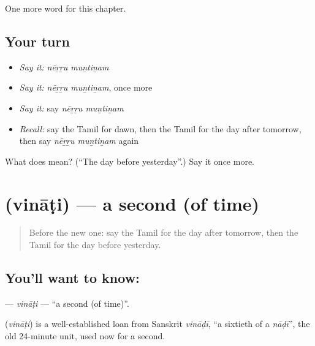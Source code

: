 \begin{grammarlens}[title={What you've built}]
One more word for this chapter.
\end{grammarlens}

\subsection*{Your turn}
\begin{itemize}
\raggedright
  \item \emph{Say it:} \emph{nēṟṟu muṉtiṉam}
  \item \emph{Say it:} \emph{nēṟṟu muṉtiṉam}, once more
  \item \emph{Say it:} say \emph{nēṟṟu muṉtiṉam}
  \item \emph{Recall:} say the Tamil for dawn, then the Tamil for the day after tomorrow, then say \emph{nēṟṟu muṉtiṉam} again
\end{itemize}

\begin{tcolorbox}[breakable,colback=teal!4,colframe=teal!35!black,title={Before you move on}]
What does   mean? (\textquotedblleft{}The day before yesterday\textquotedblright{}.) Say it once more.
\end{tcolorbox}
\section[\texorpdfstring{\ta{விநாடி} (vināṭi)}{விநாடி (vināṭi)}]{ (vināṭi) — a second (of time)}

\label{lesson:TA-C233-vinati}



\begin{quote}
Before the new one: say the Tamil for the day after tomorrow, then the Tamil for the day before yesterday.
\end{quote}

\subsection*{You'll want to know: }
\textbf{} — \emph{vināṭi} — \textquotedblleft{}a second (of time)\textquotedblright{}.

\begin{cousinweb}
\textbf{} (\emph{vināṭi}) is a well-established loan from Sanskrit \emph{vināḍī}, \textquotedblleft{}a sixtieth of a \emph{nāḍī}\textquotedblright{}, the old 24-minute unit, used now for a second.
\end{cousinweb}

